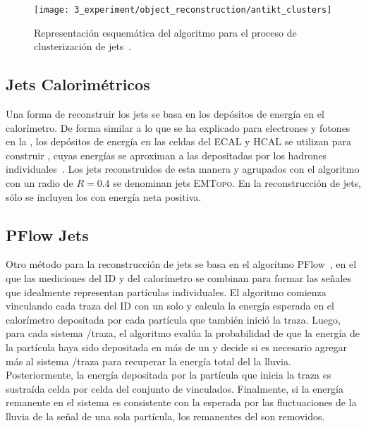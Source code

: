 \begin{figure}[ht!]
    \centering
    \texttt{[image: 3\_experiment/object\_reconstruction/antikt\_clusters]}
    \caption{Representación esquemática del algoritmo \antikt para el proceso de clusterización de jets~\cite{AntiKtAlgorithm}.}
    \label{fig:objects:jets:antikt}
\end{figure}

\subsection{Jets Calorimétricos}

Una forma de reconstruir los jets se basa en los depósitos de energía en el calorímetro. De forma similar a lo que se ha explicado para electrones y fotones en la \Sect{\ref{subsec:objects:egamma:reco}}, los depósitos de energía en las celdas del \ac{ECAL} y \ac{HCAL} se utilizan para construir \topos, cuyas energías se aproximan a las depositadas por los hadrones individuales~\cite{ATLAS-TopoClusters-Run1,ATLAS-TopoClusters-Run2}. Los jets reconstruidos de esta manera y agrupados con el algoritmo \antikt con un radio de \(R=0.4\) se denominan jets \textsc{EMTopo}. En la reconstrucción de jets, sólo se incluyen los \topos con energía neta positiva.

\subsection{\acf{PFlow} Jets}

Otro método para la reconstrucción de jets se basa en el algoritmo \ac{PFlow}~\cite{ATLAS-JetPFlow-Performance}, en el que las mediciones del \ac{ID} y del calorímetro se combinan para formar las señales que idealmente representan partículas individuales. El algoritmo comienza vinculando cada traza del \ac{ID} con un solo \topo y calcula la energía esperada en el calorímetro depositada por cada partícula que también inició la traza. Luego, para cada sistema \topo/traza, el algoritmo evalúa la probabilidad de que la energía de la partícula haya sido depositada en más de un \topo y decide si es necesario agregar más \topos al sistema \topo/traza para recuperar la energía total del la lluvia. Posteriormente, la energía depositada por la partícula que inicia la traza es sustraída celda por celda del conjunto de \topos vinculados. Finalmente, si la energía remanente en el sistema es consistente con la esperada por las fluctuaciones de la lluvia de la señal de una sola partícula, los remanentes del \topo son removidos.

